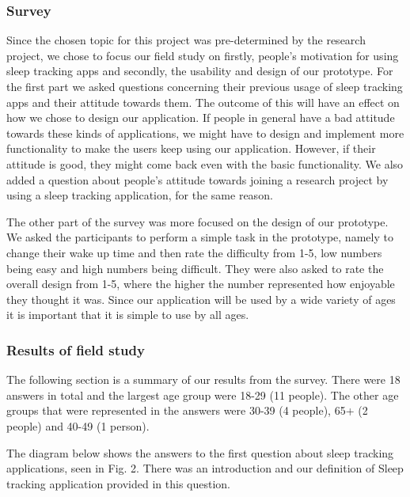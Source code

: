 \documentclass{article}
\begin{document}
\subsubsection{Survey}

Since the chosen topic for this project was pre-determined by the research project, we chose to focus our field study on firstly, people’s motivation for using sleep tracking apps and secondly, the usability and design of our prototype. For the first part we asked questions concerning their previous usage of sleep tracking apps and their attitude towards them. The outcome of this will have an effect on how we chose to design our application. If people in general have a bad attitude towards these kinds of applications, we might have to design and implement more functionality to make the users keep using our application. However, if their attitude is good, they might come back even with the basic functionality. We also added a question about people’s attitude towards joining a research project by using a sleep tracking application, for the same reason. 

The other part of the survey was more focused on the design of our prototype. We asked the participants to perform a simple task in the prototype, namely to change their wake up time and then rate the difficulty from 1-5, low numbers being easy and high numbers being difficult. They were also asked to rate the overall design from 1-5, where the higher the number represented how enjoyable they thought it was. Since our application will be used by a wide variety of ages it is important that it is simple to use by all ages. 

\subsubsection{Results of field study}
The following section is a summary of our results from the survey. There were 18 answers in total and the largest age group were 18-29 (11 people). The other age groups that were represented in the answers were 30-39 (4 people), 65+ (2 people) and 40-49 (1 person). 

The diagram below shows the answers to the first question about sleep tracking applications, seen in Fig. 2. There was an introduction and our definition of Sleep tracking application provided in this question. 
\end{document}
